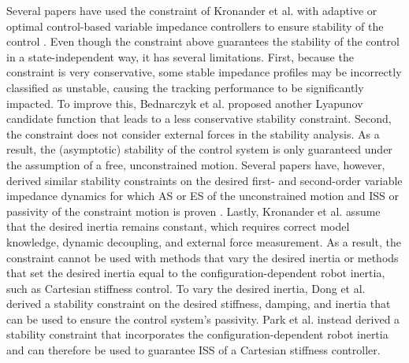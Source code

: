 Several papers have used the constraint of Kronander et al. \cite{kronanderStabilityConsiderationsVariable2016} with adaptive or optimal control-based variable impedance controllers to ensure stability of the control \cite{fontanelliComparisonAssistiveMethods2018,liuAdaptiveEnhancedAdmittance2022,liangAdaptiveTimeVaryingImpedance2022,heVariableImpedanceControl2020,dongAdaptiveStiffnessDamping2019}. Even though the constraint above guarantees the stability of the control in a state-independent way, it has several limitations. First, because the constraint is very conservative, some stable impedance profiles may be incorrectly classified as unstable, causing the tracking performance to be significantly impacted. To improve this, Bednarczyk et al. \cite{bednarczykPassivityFilterVariable2020} proposed another Lyapunov candidate function that leads to a less conservative stability constraint. Second, the constraint does not consider external forces in the stability analysis. As a result, the (asymptotic) stability of the control system is only guaranteed under the assumption of a free, unconstrained motion. Several papers have, however, derived similar stability constraints on the desired first- and second-order variable impedance dynamics for which AS or ES of the unconstrained motion and ISS or passivity of the constraint motion is proven
\cite{parkInputtoStateStabilityVariable2020,sunStabilityGuaranteedVariableImpedance2021,zhangNeuralApproximationbasedAdaptive2020,bednarczykPassivityFilterVariable2020}. Lastly, Kronander et al. \cite{kronanderStabilityConsiderationsVariable2016} assume that the desired inertia remains constant, which requires correct model knowledge, dynamic decoupling, and external force measurement. As a result, the constraint cannot be used with methods that vary the desired inertia or methods that set the desired inertia equal to the configuration-dependent robot inertia, such as Cartesian stiffness control. To vary the desired inertia, Dong et al. \cite{dongUDEBasedVariableImpedance2019} derived a stability constraint on the desired stiffness, damping, and inertia that can be used to ensure the control system's passivity. Park et al. \cite{parkInputtoStateStabilityVariable2020} instead derived a stability constraint that incorporates the configuration-dependent robot inertia and can therefore be used to guarantee ISS of a Cartesian stiffness controller.
